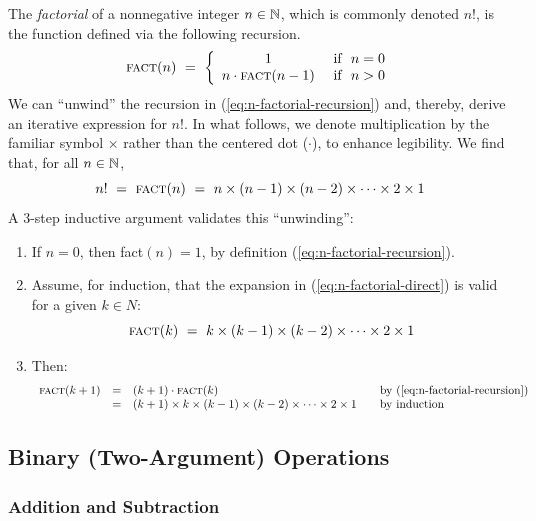 The {\it factorial} of a nonnegative integer $n \in \mathbb{N}$, which is commonly denoted $n!$, is the function defined via the following recursion.
\begin{equation}
\label{eq:n-factorial-recursion}
\mbox{\sc fact}(n) \ = \ \left\{
\begin{array}{cl}
1 & \mbox{  if } \ n=0 \\
n \cdot \mbox{\sc fact}(n-1) & \mbox{  if } \ n>0
\end{array}
\right.
\end{equation}
We can ``unwind'' the recursion in (\ref{eq:n-factorial-recursion}) and, thereby, derive an iterative expression for $n!$.  In what follows, we denote multiplication by the familiar symbol $\times$ rather than the centered dot ($\cdot$), to enhance legibility.  We find that, for all $n \in \mathbb{N}$,
\begin{equation}
\label{eq:n-factorial-direct}
n! \ = \ \mbox{\sc fact}(n) \ = \ 
n \times (n-1) \times (n-2) \times \cdots \times 2 \times 1
\end{equation} 
A $3$-step inductive argument validates this ``unwinding'':
\begin{enumerate}
\item
If $n =0$, then {\sc fact}$(n) = 1$, by definition (\ref{eq:n-factorial-recursion}).
\item
Assume, for induction, that the expansion in (\ref{eq:n-factorial-direct}) is valid for a given $k \in N$:
\[ \mbox{\sc fact}(k) \ = \ k \times (k-1) \times (k-2) \times \cdots \times 2 \times 1 \] 
\item
Then:
\[
\begin{array}{lclll}
\mbox{\sc fact}(k+1) & = & (k+1) \cdot \mbox{\sc fact}(k)
  & & \mbox{by (\ref{eq:n-factorial-recursion})} \\
  & = &
(k+1) \times k \times (k-1) \times (k-2) \times \cdots \times 2 \times 1
  & & \mbox{by induction}
\end{array}
\]
\end{enumerate}


\subsection{Binary (Two-Argument) Operations}
\label{sec:binary-operators}

\subsubsection{Addition and Subtraction}
 
\index{arithmetic!addition}

